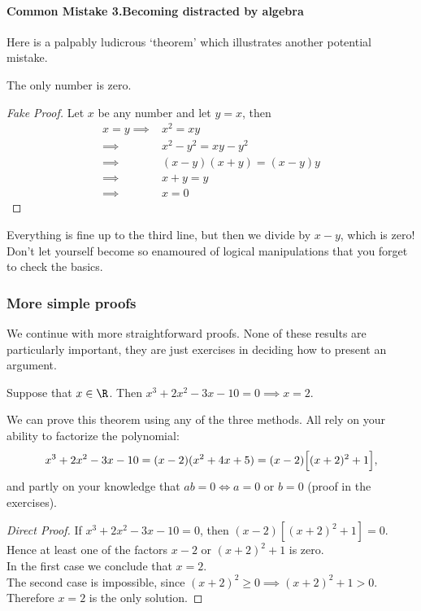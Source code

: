 \paragraph{Common Mistake 3.\quad Becoming distracted by algebra}

Here is a palpably ludicrous `theorem' which illustrates another potential mistake.

\begin{thm*}
The only number is zero.
\end{thm*}

\begin{proof}[Fake Proof]
Let $x$ be any number and let $y=x$, then
\begin{align*}
x=y\implies &x^2=xy\tag*{(Multiply both sides by $x$)}\\
\implies &x^2-y^2=xy-y^2\tag*{(Subtract $y^2$ from both sides)}\\
\implies &(x-y)(x+y)=(x-y)y\tag*{(Factorize)}\\
\implies &x+y=y\tag*{(Divide both sides by $x-y$)}\\
\implies &x=0 \tag*{\qedhere}
\end{align*}
\end{proof}

\noindent Everything is fine up to the third line, but then we divide by $x-y$, which is zero! Don't let yourself become so enamoured of logical manipulations that you forget to check the basics.


\subsubsection*{More simple proofs}

We continue with more straightforward proofs. None of these results are particularly important, they are just exercises in deciding how to present an argument.

\begin{thm}\label{thm:polyroot}
Suppose that $x\in\R$. Then $x^3+2x^2-3x-10=0\implies x=2$.
\end{thm}

\noindent We can prove this theorem using any of the three methods. All rely on your ability to factorize the polynomial:
\[x^3+2x^2-3x-10=(x-2)(x^2+4x+5)=(x-2)\Bigl[(x+2)^2+1\Bigr],\]
and partly on your knowledge that $ab=0\iff a=0$ or $b=0$ (proof in the exercises).

\begin{proof}[Direct Proof]
If $x^3+2x^2-3x-10=0$, then $(x-2)[(x+2)^2+1]=0$. Hence at least one of the factors $x-2$ or $(x+2)^2+1$ is zero.\\
In the first case we conclude that $x=2$.\\
The second case is impossible, since $(x+2)^2\ge 0\implies (x+2)^2+1>0$.\\
Therefore $x=2$ is the only solution.
\end{proof}

